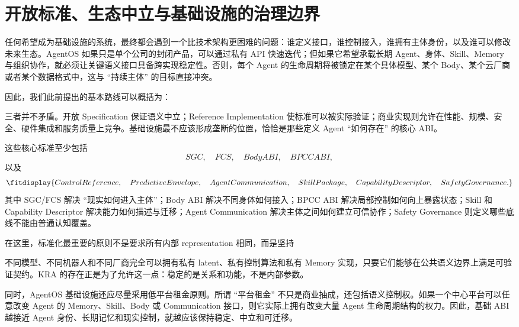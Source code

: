 \section{开放标准、生态中立与基础设施的治理边界}

任何希望成为基础设施的系统，最终都会遇到一个比技术架构更困难的问题：谁定义接口，谁控制接入，谁拥有主体身份，以及谁可以修改未来生态。AgentOS 如果只是单个公司的封闭产品，可以通过私有 API 快速迭代；但如果它希望承载长期 Agent、身体、Skill、Memory 与组织协作，就必须让关键语义接口具备跨实现稳定性。否则，每个 Agent 的生命周期将被锁定在某个具体模型、某个 Body、某个云厂商或者某个数据格式中，这与 ``持续主体'' 的目标直接冲突。

因此，我们此前提出的基本路线可以概括为：
\begin{statementbox}
\centering
{}
\end{statementbox}
三者并不矛盾。开放 Specification 保证语义中立；Reference Implementation 使标准可以被实际验证；商业实现则允许在性能、规模、安全、硬件集成和服务质量上竞争。基础设施最不应该形成垄断的位置，恰恰是那些定义 Agent ``如何存在'' 的核心 ABI。

这些核心标准至少包括
\[
SGC,\quad
FCS,\quad
BodyABI,\quad
BPCCABI,
\]
以及
\[
\fitdisplay{
ControlReference,\quad
PredictiveEnvelope,\quad
AgentCommunication,\quad
SkillPackage,\quad
CapabilityDescriptor,\quad
SafetyGovernance.
}
\]
其中 SGC/FCS 解决 ``现实如何进入主体''；Body ABI 解决不同身体如何接入；BPCC ABI 解决局部控制如何向上暴露状态；Skill 和 Capability Descriptor 解决能力如何描述与迁移；Agent Communication 解决主体之间如何建立可信协作；Safety Governance 则定义哪些底线不能由普通认知覆盖。

在这里，标准化最重要的原则不是要求所有内部 representation 相同，而是坚持
\begin{statementbox}
\centering
{}
\end{statementbox}
不同模型、不同机器人和不同厂商完全可以拥有私有 latent、私有控制算法和私有 Memory 实现，只要它们能够在公共语义边界上满足可验证契约。KRA 的存在正是为了允许这一点：稳定的是关系和功能，不是内部参数。

同时，AgentOS 基础设施还应尽量采用低平台租金原则。所谓 ``平台租金'' 不只是商业抽成，还包括语义控制权。如果一个中心平台可以任意改变 Agent 的 Memory、Skill、Body 或 Communication 接口，则它实际上拥有改变大量 Agent 生命周期结构的权力。因此，基础 ABI 越接近 Agent 身份、长期记忆和现实控制，就越应该保持稳定、中立和可迁移。

